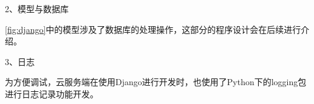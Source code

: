 
2、模型与数据库

\autoref{fig:django}中的模型涉及了数据库的处理操作，这部分的程序设计会在后续进行介绍。

3、日志

为方便调试，云服务端在使用Django进行开发时，也使用了Python下的logging包进行日志记录功能开发。


